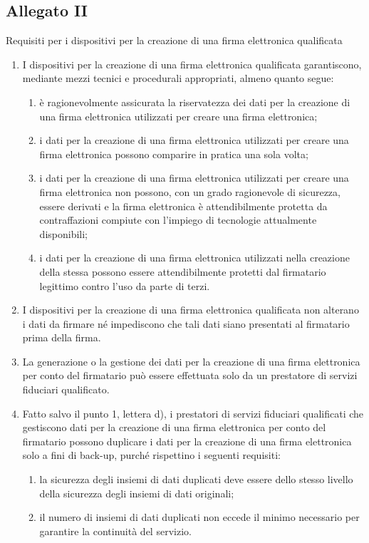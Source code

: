 \subsection*{Allegato II}\label{sec:allegatoIIreg9102014}
Requisiti per i dispositivi per la creazione di una firma elettronica qualificata
\begin{enumerate}
	\item I dispositivi per la creazione di una firma elettronica qualificata garantiscono, mediante mezzi tecnici e procedurali appropriati, almeno quanto segue:
	\begin{enumerate}
		\item 	
		è ragionevolmente assicurata la riservatezza dei dati per la creazione di una firma elettronica utilizzati per creare una firma elettronica;
		\item 	
		i dati per la creazione di una firma elettronica utilizzati per creare una firma elettronica possono comparire in pratica una sola volta;
		\item 	
		i dati per la creazione di una firma elettronica utilizzati per creare una firma elettronica non possono, con un grado ragionevole di sicurezza, essere derivati e la firma elettronica è attendibilmente protetta da contraffazioni compiute con l’impiego di tecnologie attualmente disponibili;
		\item i dati per la creazione di una firma elettronica utilizzati nella creazione della stessa possono essere attendibilmente protetti dal firmatario legittimo contro l’uso da parte di terzi.
	\end{enumerate}
\item I dispositivi per la creazione di una firma elettronica qualificata non alterano i dati da firmare né impediscono che tali dati siano presentati al firmatario prima della firma.
\item La generazione o la gestione dei dati per la creazione di una firma elettronica per conto del firmatario può essere effettuata solo da un prestatore di servizi fiduciari qualificato.
\item Fatto salvo il punto 1, lettera d), i prestatori di servizi fiduciari qualificati che gestiscono dati per la creazione di una firma elettronica per conto del firmatario possono duplicare i dati per la creazione di una firma elettronica solo a fini di back-up, purché rispettino i seguenti requisiti:
\begin{enumerate}
	\item 	
	la sicurezza degli insiemi di dati duplicati deve essere dello stesso livello della sicurezza degli insiemi di dati originali;
	\item 	
	il numero di insiemi di dati duplicati non eccede il minimo necessario per garantire la continuità del servizio.
\end{enumerate}
\end{enumerate}
